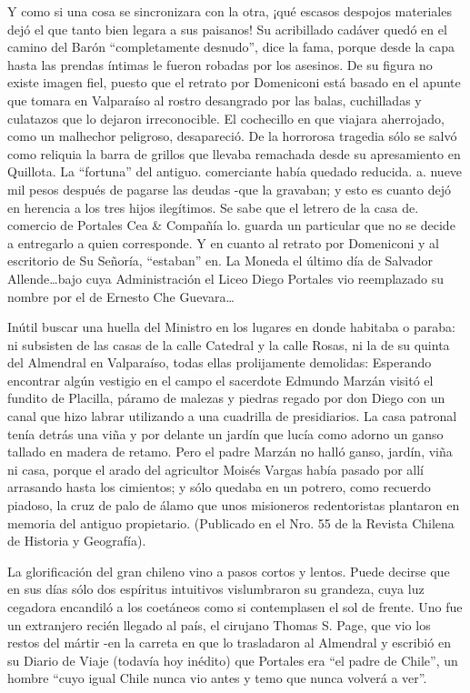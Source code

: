 \documentclass[10pt,twoside,openright]{memoir}
\begin{document}
Y como si una cosa se sincronizara con la otra, ¡qué escasos despojos
materiales dejó el que tanto bien legara a sus paisanos! Su acribillado
cadáver quedó en el camino del Barón ``completamente desnudo'', dice la
fama, porque desde la capa hasta las prendas íntimas le fueron robadas
por los asesinos. De su figura no existe imagen fiel, puesto que el
retrato por Domeniconi está basado en el apunte que tomara en Valparaíso
al rostro desangrado por las balas, cuchilladas y culatazos que lo
dejaron irreconocible. El cochecillo en que viajara aherrojado, como un
malhechor peligroso, desapareció. De la horrorosa tragedia sólo se salvó
como reliquia la barra de grillos que llevaba remachada desde su
apresamiento en Quillota. La ``fortuna'' del antiguo. comerciante había
quedado reducida. a. nueve mil pesos después de pagarse las deudas -que
la gravaban; y esto es cuanto dejó en herencia a los tres hijos
ilegítimos. Se sabe que el letrero de la casa de. comercio de Portales
Cea \& Compañía lo. guarda un particular que no se decide a entregarlo a
quien corresponde. Y en cuanto al retrato por Domeniconi y al escritorio
de Su Señoría, ``estaban'' en. La Moneda el último día de Salvador
Allende\ldots bajo cuya Administración el Liceo Diego Portales vio
reemplazado su nombre por el de Ernesto Che Guevara\ldots{}

Inútil buscar una huella del Ministro en los lugares en donde habitaba o
paraba: ni subsisten de las casas de la calle Catedral y la calle Rosas,
ni la de su quinta del Almendral en Valparaíso, todas ellas prolijamente
demolidas: Esperando encontrar algún vestigio en el campo el sacerdote
Edmundo Marzán visitó el fundito de Placilla, páramo de malezas y
piedras regado por don Diego con un canal que hizo labrar utilizando a
una cuadrilla de presidiarios. La casa patronal tenía detrás una viña y
por delante un jardín que lucía como adorno un ganso tallado en madera
de retamo. Pero el padre Marzán no halló ganso, jardín, viña ni casa,
porque el arado del agricultor Moisés Vargas había pasado por allí
arrasando hasta los cimientos; y sólo quedaba en un potrero, como
recuerdo piadoso, la cruz de palo de álamo que unos misioneros
redentoristas plantaron en memoria del antiguo propietario. (Publicado
en el Nro. 55 de la Revista Chilena de Historia y Geografía).

La glorificación del gran chileno vino a pasos cortos y lentos. Puede
decirse que en sus días sólo dos espíritus intuitivos vislumbraron su
grandeza, cuya luz cegadora encandiló a los coetáneos como si
contemplasen el sol de frente. Uno fue un extranjero recién llegado al
país, el cirujano Thomas S. Page, que vio los restos del mártir -en la
carreta en que lo trasladaron al Almendral y escribió en su Diario de
Viaje (todavía hoy inédito) que Portales era ``el padre de Chile'', un
hombre ``cuyo igual Chile nunca vio antes y temo que nunca volverá a
ver''.
\end{document}
